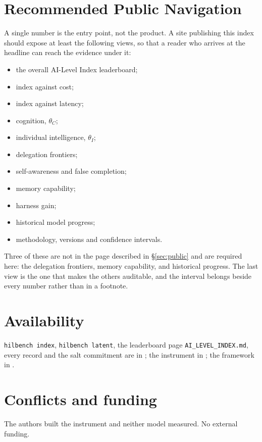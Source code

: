 \section{Recommended Public Navigation}\label{app:navigation}

A single number is the entry point, not the product. A site publishing this index should
expose at least the following views, so that a reader who arrives at the headline can
reach the evidence under it:

\begin{itemize}\itemsep2pt
\item the overall AI-Level Index leaderboard;
\item index against cost;
\item index against latency;
\item cognition, $\theta_C$;
\item individual intelligence, $\theta_I$;
\item delegation frontiers;
\item self-awareness and false completion;
\item memory capability;
\item harness gain;
\item historical model progress;
\item methodology, versions and confidence intervals.
\end{itemize}

\noindent Three of these are not in the page described in \S\ref{sec:public} and are
required here: the delegation frontiers, memory capability, and historical progress. The
last view is the one that makes the others auditable, and the interval belongs beside every
number rather than in a footnote.

\section*{Availability}
\texttt{hilbench index}, \texttt{hilbench latent}, the leaderboard page \texttt{AI\_LEVEL\_INDEX.md}, every record and the salt commitment are in \citet{yang2026hilbench}; the instrument in \citet{yang2026hilbenchpaper}; the framework in \citet{yang2026unified}.

\section*{Conflicts and funding}
The authors built the instrument and neither model measured. No external funding.
